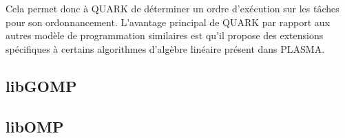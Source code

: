 Cela permet donc à QUARK de déterminer un ordre d'exécution sur les tâches pour son ordonnancement.
L'avantage principal de QUARK par rapport aux autres modèle de programmation similaires est qu'il propose des extensions spécifiques à certains algorithmes d'algèbre linéaire présent dans PLASMA.

\subsection{libGOMP}

\subsection{libOMP}
